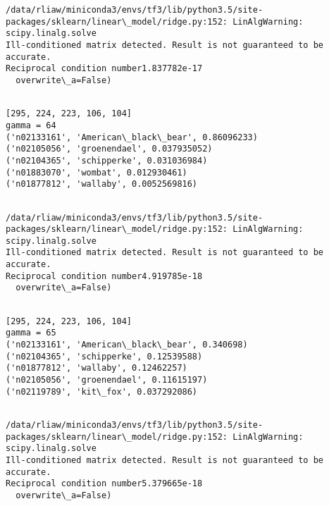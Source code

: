 \documentclass[11pt]{article}
\begin{document}
    \begin{Verbatim}[commandchars=\\\{\}]
/data/rliaw/miniconda3/envs/tf3/lib/python3.5/site-packages/sklearn/linear\_model/ridge.py:152: LinAlgWarning: scipy.linalg.solve
Ill-conditioned matrix detected. Result is not guaranteed to be accurate.
Reciprocal condition number1.837782e-17
  overwrite\_a=False)

    \end{Verbatim}

    \begin{Verbatim}[commandchars=\\\{\}]

[295, 224, 223, 106, 104]
gamma = 64
('n02133161', 'American\_black\_bear', 0.86096233)
('n02105056', 'groenendael', 0.037935052)
('n02104365', 'schipperke', 0.031036984)
('n01883070', 'wombat', 0.012930461)
('n01877812', 'wallaby', 0.0052569816)


    \end{Verbatim}

    \begin{Verbatim}[commandchars=\\\{\}]
/data/rliaw/miniconda3/envs/tf3/lib/python3.5/site-packages/sklearn/linear\_model/ridge.py:152: LinAlgWarning: scipy.linalg.solve
Ill-conditioned matrix detected. Result is not guaranteed to be accurate.
Reciprocal condition number4.919785e-18
  overwrite\_a=False)

    \end{Verbatim}

    \begin{Verbatim}[commandchars=\\\{\}]

[295, 224, 223, 106, 104]
gamma = 65
('n02133161', 'American\_black\_bear', 0.340698)
('n02104365', 'schipperke', 0.12539588)
('n01877812', 'wallaby', 0.12462257)
('n02105056', 'groenendael', 0.11615197)
('n02119789', 'kit\_fox', 0.037292086)


    \end{Verbatim}

    \begin{Verbatim}[commandchars=\\\{\}]
/data/rliaw/miniconda3/envs/tf3/lib/python3.5/site-packages/sklearn/linear\_model/ridge.py:152: LinAlgWarning: scipy.linalg.solve
Ill-conditioned matrix detected. Result is not guaranteed to be accurate.
Reciprocal condition number5.379665e-18
  overwrite\_a=False)

    \end{Verbatim}
\end{document}
